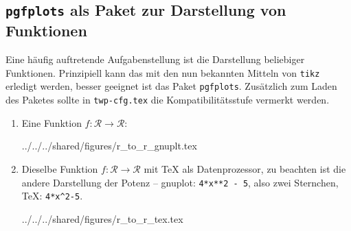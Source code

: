 \subsection{\texttt{pgfplots} als Paket zur Darstellung von Funktionen}

Eine häufig auftretende Aufgabenstellung ist die Darstellung beliebiger
Funktionen. Prinzipiell kann das mit den nun bekannten Mitteln von
\texttt{tikz} erledigt werden, besser geeignet ist das Paket \texttt{pgfplots}.
Zusätzlich zum Laden des Paketes sollte in \texttt{twp-cfg.tex} die
Kompatibilitätsstufe vermerkt werden.

\begin{enumerate}
  \item Eine Funktion \(f: \mathcal R \rightarrow \mathcal R\):
\begin{verbatimwrite}{../../../shared/figures/r_to_r_gnuplt.tex}
\end{verbatimwrite}
    

    

  \item Dieselbe Funktion \(f: \mathcal R \rightarrow \mathcal R\) mit
    \TeX{} als Datenprozessor, zu beachten ist die andere Darstellung der
    Potenz -- gnuplot: \lstinline|4*x**2 - 5|, also zwei Sternchen, \TeX:
    \lstinline|4*x^2-5|.
\begin{verbatimwrite}{../../../shared/figures/r_to_r_tex.tex}
\end{verbatimwrite}
    


\end{enumerate}

